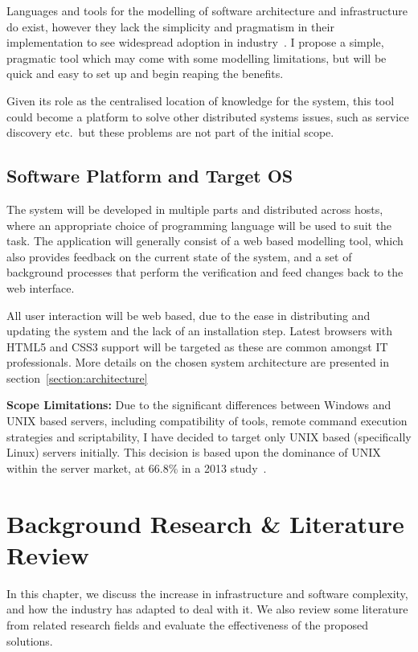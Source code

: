 \documentclass{cshonours}
\begin{document}
Languages and tools for the modelling of software architecture and infrastructure do exist, however they lack the simplicity and pragmatism in their implementation to see widespread adoption in industry~\cite{ModellingAdoption}. I propose a simple, pragmatic tool which may come with some modelling limitations, but will be quick and easy to set up and begin reaping the benefits.

Given its role as the centralised location of knowledge for the system, this tool could become a platform to solve other distributed systems issues, such as service discovery etc.\ but these problems are not part of the initial scope.

\section{Software Platform and Target OS}

The system will be developed in multiple parts and distributed across hosts, where an appropriate choice of programming language will be used to suit the task. The application will generally consist of a web based modelling tool, which also provides feedback on the current state of the system, and a set of background processes that perform the verification and feed changes back to the web interface.

All user interaction will be web based, due to the ease in distributing and updating the system and the lack of an installation step. Latest browsers with HTML5 and CSS3 support will be targeted as these are common amongst IT professionals. More details on the chosen system architecture are presented in section~\ref{section:architecture}

\textbf{Scope Limitations:} Due to the significant differences between Windows and UNIX based servers, including compatibility of tools, remote command execution strategies and scriptability, I have decided to target only UNIX based (specifically Linux) servers initially. This decision is based upon the dominance of UNIX within the server market, at 66.8\% in a 2013 study~\cite{UnixMarketShare}.

\chapter{Background Research \& Literature Review}

In this chapter, we discuss the increase in infrastructure and software complexity, and how the industry has adapted to deal with it. We also review some literature from related research fields and evaluate the effectiveness of the proposed solutions.
\end{document}
